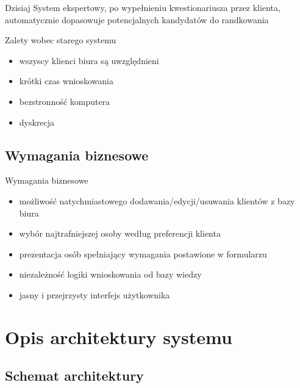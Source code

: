 \documentclass{beamer}
\begin{document}
\begin{frame}
	
	\begin{block}{Dzisiaj}
		System ekspertowy, po wypełnieniu kwestionariusza przez klienta, automatycznie dopasowuje potencjalnych kandydatów do randkowania
	\end{block}
	
	\begin{block}{Zalety wobec starego systemu}
		\begin{itemize}
			\item wszyscy klienci biura są uwzględnieni 
			\item krótki czas wnioskowania
			\item bezstronność komputera
			\item dyskrecja
		\end{itemize}
	\end{block}

\end{frame}

\subsection{Wymagania biznesowe}

\begin{frame}
	
	\begin{block}{Wymagania biznesowe}
		\begin{itemize}
			\item możliwość natychmiastowego dodawania/edycji/usuwania klientów z bazy biura
			\item wybór najtrafniejszej osoby według preferencji klienta
			\item prezentacja osób spełniający wymagania postawione w formularzu
			\item niezależność logiki wnioskowania od bazy wiedzy
			\item jasny i przejrzysty interfejs użytkownika
		\end{itemize}
	\end{block}

\end{frame}

\section{Opis architektury systemu}

\subsection{Schemat architektury}
\end{document}
